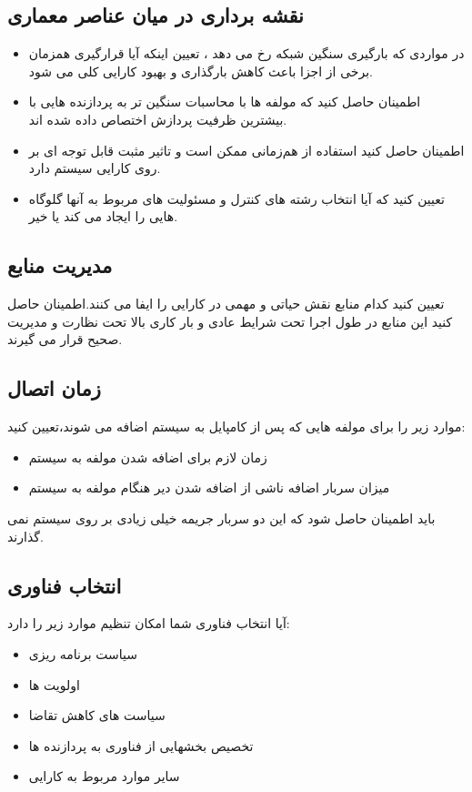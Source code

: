 \subsection{نقشه برداری در میان عناصر معماری}
\begin{itemize}
\item
در مواردی که بارگیری سنگین شبکه رخ می دهد ، تعیین اینکه آیا قرارگیری همزمان برخی از اجزا باعث کاهش بارگذاری و بهبود کارایی کلی می شود.
\item
اطمینان حاصل کنید که مولفه ها با محاسبات سنگین تر به پردازنده هایی با بیشترین ظرفیت پردازش اختصاص داده شده اند.
\item
اطمینان حاصل کنید استفاده از هم‌زمانی ممکن است و تاثیر مثبت قابل توجه ای بر روی کارایی سیستم دارد.
\item
تعیین کنید که آیا انتخاب رشته های کنترل و مسئولیت های مربوط به آنها گلوگاه هایی را ایجاد می کند یا خیر.
\end{itemize}
\subsection{مدیریت منابع}
تعیین کنید کدام منابع نقش حیاتی و مهمی در کارایی را ایفا می کنند.اطمینان حاصل کنید این منابع در طول اجرا تحت شرایط عادی و بار کاری بالا تحت نظارت و مدیریت صحیح قرار می گیرند.
\subsection{زمان اتصال}
موارد زیر را برای مولفه هایی که پس از کامپایل  به سیستم اضافه می شوند،‌تعیین کنید:
\begin{itemize}
\item
زمان لازم برای اضافه شدن مولفه به سیستم
\item
میزان سربار اضافه ناشی از اضافه شدن دیر هنگام مولفه به سیستم
\end{itemize}
باید اطمینان حاصل شود که این دو سربار جریمه خیلی زیادی بر روی سیستم نمی گذارند.
\subsection{انتخاب فناوری}
آیا انتخاب فناوری شما امکان تنظیم موارد زیر را دارد:
\begin{itemize}
\item
سیاست برنامه ریزی
\item
اولویت ها
\item
سیاست های کاهش تقاضا
\item
تخصیص بخشهایی از فناوری به پردازنده ها
\item
سایر موارد مربوط به کارایی
\end{itemize}







